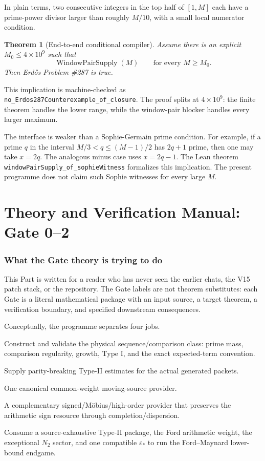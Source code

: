 \documentclass[11pt]{article}
\newtheorem{theorem}{Theorem}[section]
\theoremstyle{definition}
\newcommand{\1}{\mathbf 1}
\newcommand{\WPS}{\operatorname{WindowPairSupply}}
\begin{document}
In plain terms, two consecutive integers in the top half of $[1,M]$ each have a
prime-power divisor larger than roughly $M/10$, with a small local numerator condition.

\begin{theorem}[End-to-end conditional compiler]
Assume there is an explicit $M_0\le4\times10^9$ such that
\[
\WPS(M)\qquad\text{for every }M\ge M_0.
\]
Then Erd\H{o}s Problem \#287 is true.
\end{theorem}

This implication is machine-checked as
\texttt{no\_Erdos287Counterexample\_of\_closure}.  The proof splits at
$4\times10^9$: the finite theorem handles the lower range, while the window-pair blocker
handles every larger maximum.

The interface is weaker than a Sophie-Germain prime condition.  For example, if a prime
$q$ in the interval $M/3<q\le(M-1)/2$ has $2q+1$ prime, then one may take
$x=2q$.  The analogous minus case uses $x=2q-1$.  The Lean theorem
\texttt{windowPairSupply\_of\_sophieWitness} formalizes this implication.  The present
programme does not claim such Sophie witnesses for every large $M$.



\clearpage
\part{Theory and Verification Manual: Gate 0--2}
\label{part:theory-manual}

\section{What the Gate theory is trying to do}
\label{sec:theory-purpose}

This Part is written for a reader who has never seen the earlier chats, the V15 patch stack,
or the repository.  The Gate labels are not theorem substitutes: each Gate is a literal
mathematical package with an input source, a target theorem, a verification boundary, and
specified downstream consequences.

Conceptually, the programme separates four jobs.

\begin{description}[leftmargin=2.3cm,style=nextline]
\item[Gate 0.] Construct and validate the physical sequence/comparison class: prime mass,
comparison regularity, growth, Type I, and the exact expected-term convention.
\item[Gate 1.] Supply parity-breaking Type-II estimates for the actual generated packets.
\item[Gate 1A.] One canonical common-weight moving-source provider.
\item[Gate 1B.] A complementary signed/M\"obius/high-order provider that preserves the
arithmetic sign resource through completion/dispersion.
\item[Gate 2.] Consume a source-exhaustive Type-II package, the Ford arithmetic weight,
the exceptional $N_2$ sector, and one compatible $\varepsilon_\ast$ to run the
Ford--Maynard lower-bound endgame.
\end{description}
\end{document}
